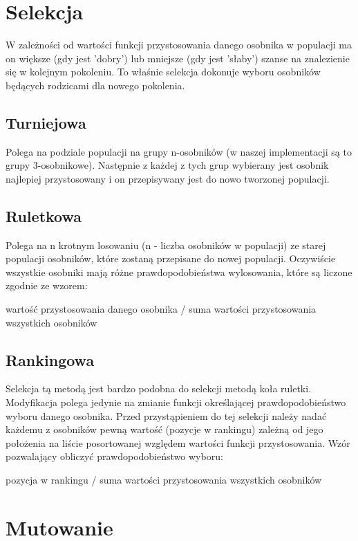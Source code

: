 \documentclass[11pt]{aghdpl}
\begin{document}
\chapter{Selekcja}
\label{cha:selection}
W zależności od wartości funkcji przystosowania danego osobnika w populacji ma on większe (gdy jest 'dobry') lub mniejsze (gdy jest 'słaby') szanse na znalezienie się w kolejnym pokoleniu. To właśnie selekcja dokonuje wyboru osobników będących rodzicami dla nowego pokolenia.
\section{Turniejowa}
\label{sec:tournament}
Polega na podziale populacji na grupy n-osobników (w naszej implementacji są to grupy 3-osobnikowe). Następnie z każdej z tych grup wybierany jest osobnik najlepiej przystosowany i on przepisywany jest do nowo tworzonej populacji.

\section{Ruletkowa}
\label{sec:roulette}
Polega na n krotnym losowaniu (n - liczba osobników w populacji) ze starej populacji osobników, które zostaną przepisane do nowej populacji. Oczywiście wszystkie osobniki mają różne prawdopodobieństwa wylosowania, które są liczone zgodnie ze wzorem:
\begin{center}
wartość przystosowania danego osobnika / suma wartości przystosowania wszystkich osobników
\end{center}
 
\section{Rankingowa}
\label{sec:linear}
Selekcja tą metodą jest bardzo podobna do selekcji metodą koła ruletki. Modyfikacja polega jedynie na zmianie funkcji określającej prawdopodobieństwo wyboru danego osobnika. Przed przystąpieniem do tej selekcji należy nadać każdemu z osobników pewną wartość (pozycje w rankingu) zależną od jego położenia na liście posortowanej względem wartości funkcji przystosowania. Wzór pozwalający obliczyć prawdopodobieństwo wyboru:
\begin{center}
pozycja w rankingu / suma wartości przystosowania wszystkich osobników
\end{center}

\chapter{Mutowanie}
\label{cha:mutation}
\end{document}
